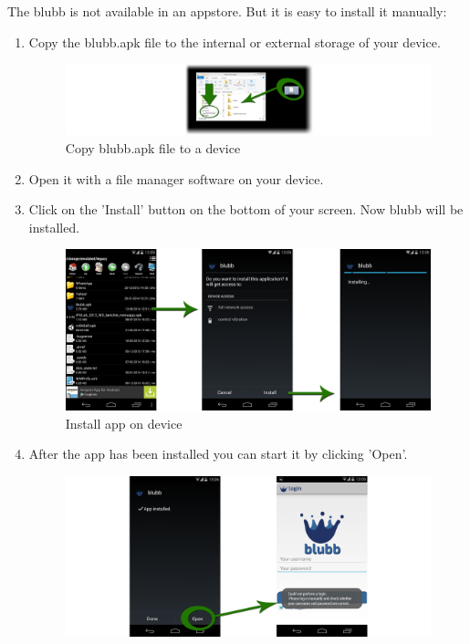 \documentclass[12pt,a4paper,oneside]{report}
\newcommand{\appname}{blubb}
\begin{document}
The \appname{} is not available in an appstore. But it is easy to install it manually:
\begin{enumerate}
\item Copy the blubb.apk file to the internal or external storage of your device.
\begin{figure}[!ht]
    \includegraphics[width=\linewidth]{CopyApk.png}
    \caption{Copy blubb.apk file to a device}
\end{figure}
\item Open it with a file manager software on your device.
\item Click on the 'Install' button on the bottom of your screen. Now \appname{} will be installed.

\begin{figure}[!ht]
    \includegraphics[width=\linewidth]{InstallApp.png}
    \caption{Install app on device}
\end{figure}

\item After the app has been installed you can start it by clicking 'Open'.


\begin{figure}[!ht]
    \includegraphics[width=\linewidth]{AppInstalled.png}
    \caption{}
\end{figure}

\end{enumerate}
\end{document}

